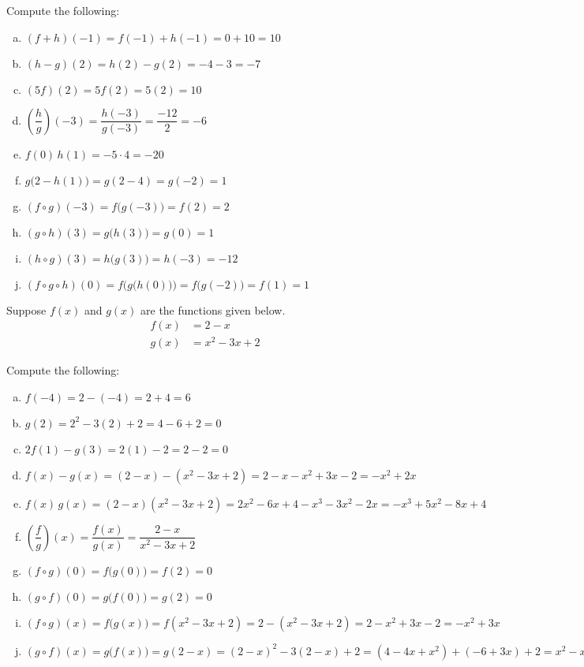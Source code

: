 \documentclass[11pt,letterpaper]{article}
\begin{document}
Compute the following: \pspace
        \begin{enumerate}[(a)]
        \item $(f + h)(-1)= f(-1) + h(-1)= 0 + 10= 10$ \vfill
        \item $(h - g)(2)= h(2) - g(2)= -4 - 3= -7$ \vfill
        \item $(5f)(2)= 5f(2)= 5(2)= 10$ \vfill
        \item $\left(\dfrac{h}{g}\right)(-3)= \dfrac{h(-3)}{g(-3)}= \dfrac{-12}{2}= -6$ \vfill
        \item $f(0)\, h(1)= -5 \cdot 4= -20$ \vfill
        \item $g \big(2 - h(1) \big)= g(2 - 4)= g(-2)= 1$ \vfill
        \item $(f \circ g)(-3)= f \big( g(-3) \big)= f(2)= 2$ \vfill
	\item $(g \circ h)(3)= g \big( h(3) \big)= g(0)= 1$ \vfill
        \item $(h \circ g)(3)= h \big( g(3) \big)= h(-3)= -12$ \vfill
	\item $(f \circ g \circ h)(0)= f \big( g \big( h(0) \big) \big)= f \big( g( -2) \big)= f(1)= 1$ \vfill
        \end{enumerate} 



\newpage



 Suppose $f(x)$ and $g(x)$ are the functions given below. 
	\[
	\begin{aligned}
	f(x)&= 2 - x \\[0.3cm]
	g(x)&= x^2 - 3x + 2
	\end{aligned}
	\]

Compute the following: \pspace
\begin{enumerate}[(a)]
\item $f(-4)= 2 - (-4)= 2 + 4= 6$ \vfill
\item $g(2)= 2^2 - 3(2) + 2= 4 - 6 + 2= 0$ \vfill
\item $2f(1) - g(3)= 2(1) - 2= 2 - 2= 0$ \vfill
\item $f(x) - g(x)= (2 - x) - (x^2 - 3x + 2)= 2 - x - x^2 + 3x - 2= -x^2 + 2x$ \vfill
\item $f(x) \, g(x)= (2 - x)(x^2 - 3x + 2)= 2x^2 - 6x + 4 - x^3 - 3x^2 - 2x= -x^3 + 5x^2 - 8x + 4$ \vfill
\item $\left( \dfrac{f}{g} \right)(x)= \dfrac{f(x)}{g(x)}= \dfrac{2 - x}{x^2 - 3x + 2}$ \vfill
\item $(f \circ g)(0)= f \big( g(0) \big)= f(2)= 0$ \vfill
\item $(g \circ f)(0)= g \big( f(0) \big)= g(2)= 0$ \vfill
\item $(f \circ g)(x)= f \big( g(x) \big)= f( x^2 - 3x + 2)= 2 - (x^2 - 3x + 2)= 2 - x^2 + 3x - 2= -x^2 + 3x$ \vfill
\item $(g \circ f)(x)= g \big( f(x) \big)= g(2 - x)= (2 - x)^2 - 3(2 - x) + 2= (4 - 4x + x^2) + (-6 + 3x) + 2= x^2 - x$ \vfill
\end{enumerate} 
\end{document}
